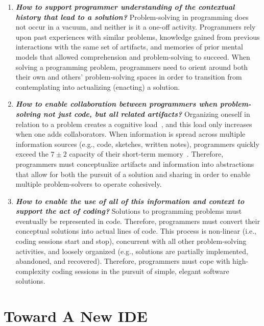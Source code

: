\documentclass{ppig}
\let\cite\shortcite %
\begin{document}
\begin{enumerate}
  \item \textit{\textbf{How to support programmer understanding of the contextual history that lead to a solution?}}
  Problem-solving in programming does not occur in a vacuum, and neither is it a one-off activity.
  Programmers rely upon past experiences with similar problems, knowledge gained from previous interactions with the same set of artifacts, and memories of prior mental models that allowed comprehension and problem-solving to succeed.
  When solving a programming problem, programmers need to orient around both their own and others' problem-solving spaces in order to transition from contemplating into actualizing (enacting) a solution.
  
  \item \textit{\textbf{How to enable collaboration between programmers when problem-solving not just code, but all related artifacts?}}
  Organizing oneself in relation to a problem creates a cognitive load~\cite{sweller1988cognitive}, and this load only increases when one adds collaborators.
  When information is spread across multiple information sources (e.g., code, sketches, written notes), programmers quickly exceed the $7\pm2$ capacity of their short-term memory~\cite{lisman1995storage}.
  Therefore, programmers must conceptualize artifacts and information into abstractions that allow for both the pursuit of a solution and sharing in order to enable multiple problem-solvers to operate cohesively.
  
  \item \textit{\textbf{How to enable the use of all of this information and context to support the act of coding?}}
  Solutions to programming problems must eventually be represented in code.
  Therefore, programmers must convert their conceptual solutions into actual lines of code.
  This process is non-linear (i.e., coding sessions start and stop), concurrent with all other problem-solving activities, and loosely organized (e.g., solutions are partially implemented, abandoned, and recovered).
  Therefore, programmers must cope with high-complexity coding sessions in the pursuit of simple, elegant software solutions.
\end{enumerate}

\section{Toward A New IDE}
\end{document}
